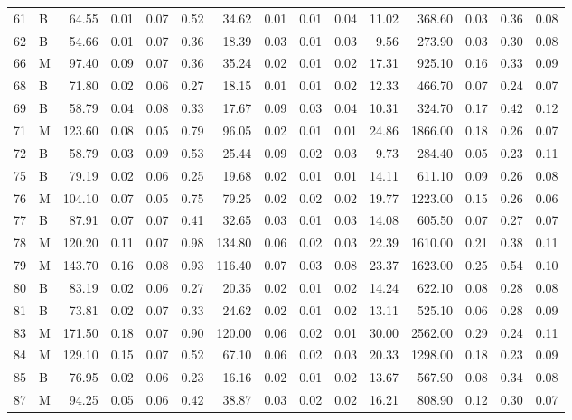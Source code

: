 \begin{table}[ht]
\begin{tabular}{rlrrrrrrrrrrrrr}
  61 & B & 64.55 & 0.01 & 0.07 & 0.52 & 34.62 & 0.01 & 0.01 & 0.04 & 11.02 & 368.60 & 0.03 & 0.36 & 0.08 \\ 
  62 & B & 54.66 & 0.01 & 0.07 & 0.36 & 18.39 & 0.03 & 0.01 & 0.03 & 9.56 & 273.90 & 0.03 & 0.30 & 0.08 \\ 
  66 & M & 97.40 & 0.09 & 0.07 & 0.36 & 35.24 & 0.02 & 0.01 & 0.02 & 17.31 & 925.10 & 0.16 & 0.33 & 0.09 \\ 
  68 & B & 71.80 & 0.02 & 0.06 & 0.27 & 18.15 & 0.01 & 0.01 & 0.02 & 12.33 & 466.70 & 0.07 & 0.24 & 0.07 \\ 
  69 & B & 58.79 & 0.04 & 0.08 & 0.33 & 17.67 & 0.09 & 0.03 & 0.04 & 10.31 & 324.70 & 0.17 & 0.42 & 0.12 \\ 
  71 & M & 123.60 & 0.08 & 0.05 & 0.79 & 96.05 & 0.02 & 0.01 & 0.01 & 24.86 & 1866.00 & 0.18 & 0.26 & 0.07 \\ 
  72 & B & 58.79 & 0.03 & 0.09 & 0.53 & 25.44 & 0.09 & 0.02 & 0.03 & 9.73 & 284.40 & 0.05 & 0.23 & 0.11 \\ 
  75 & B & 79.19 & 0.02 & 0.06 & 0.25 & 19.68 & 0.02 & 0.01 & 0.01 & 14.11 & 611.10 & 0.09 & 0.26 & 0.08 \\ 
  76 & M & 104.10 & 0.07 & 0.05 & 0.75 & 79.25 & 0.02 & 0.02 & 0.02 & 19.77 & 1223.00 & 0.15 & 0.26 & 0.06 \\ 
  77 & B & 87.91 & 0.07 & 0.07 & 0.41 & 32.65 & 0.03 & 0.01 & 0.03 & 14.08 & 605.50 & 0.07 & 0.27 & 0.07 \\ 
  78 & M & 120.20 & 0.11 & 0.07 & 0.98 & 134.80 & 0.06 & 0.02 & 0.03 & 22.39 & 1610.00 & 0.21 & 0.38 & 0.11 \\ 
  79 & M & 143.70 & 0.16 & 0.08 & 0.93 & 116.40 & 0.07 & 0.03 & 0.08 & 23.37 & 1623.00 & 0.25 & 0.54 & 0.10 \\ 
  80 & B & 83.19 & 0.02 & 0.06 & 0.27 & 20.35 & 0.02 & 0.01 & 0.02 & 14.24 & 622.10 & 0.08 & 0.28 & 0.08 \\ 
  81 & B & 73.81 & 0.02 & 0.07 & 0.33 & 24.62 & 0.02 & 0.01 & 0.02 & 13.11 & 525.10 & 0.06 & 0.28 & 0.09 \\ 
  83 & M & 171.50 & 0.18 & 0.07 & 0.90 & 120.00 & 0.06 & 0.02 & 0.01 & 30.00 & 2562.00 & 0.29 & 0.24 & 0.11 \\ 
  84 & M & 129.10 & 0.15 & 0.07 & 0.52 & 67.10 & 0.06 & 0.02 & 0.03 & 20.33 & 1298.00 & 0.18 & 0.23 & 0.09 \\ 
  85 & B & 76.95 & 0.02 & 0.06 & 0.23 & 16.16 & 0.02 & 0.01 & 0.02 & 13.67 & 567.90 & 0.08 & 0.34 & 0.08 \\ 
  87 & M & 94.25 & 0.05 & 0.06 & 0.42 & 38.87 & 0.03 & 0.02 & 0.02 & 16.21 & 808.90 & 0.12 & 0.30 & 0.07 \\ 

\end{tabular}
\end{table}

